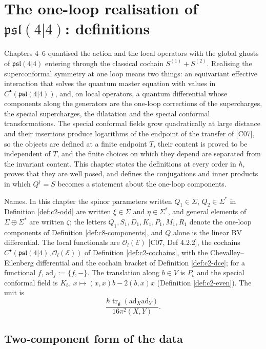 \chapter{The one-loop realisation of $\mathfrak{psl}(4|4)$: definitions}

Chapters 4--6 quantised the action and the local operators with the global ghosts of $\mathfrak{psl}(4|4)$ entering through the classical cochain $S^{(1)}+S^{(2)}$. Realising the superconformal symmetry at one loop means two things: an equivariant effective interaction that solves the quantum master equation with values in $C^\bullet(\mathfrak{psl}(4|4))$, and, on local operators, a quantum differential whose components along the generators are the one-loop corrections of the supercharges, the special supercharges, the dilatation and the special conformal transformations. The special conformal fields grow quadratically at large distance and their insertions produce logarithms of the endpoint of the transfer of [C07], so the objects are defined at a finite endpoint $T$, their content is proved to be independent of $T$, and the finite choices on which they depend are separated from the invariant content. This chapter states the definitions at every order in $\hbar$, proves that they are well posed, and defines the conjugations and inner products in which $Q^\dagger=S$ becomes a statement about the one-loop components.

Names. In this chapter the spinor parameters written $Q_1\in\Sigma$, $Q_2\in\Sigma^*$ in Definition \ref{def:c2-odd} are written $\xi\in\Sigma$ and $\eta\in\Sigma^*$, and general elements of $\Sigma\oplus\Sigma^*$ are written $\zeta$; the letters $Q_1,S_1,D_1,K_1,P_1,M_1,R_1$ denote the one-loop components of Definition \ref{def:c8-components}, and $Q$ alone is the linear BV differential. The local functionals are $\mathscr O_l(\mathscr E)$ [C07, Def 4.2.2], the cochains $C^\bullet(\mathfrak{psl}(4|4),\mathscr O_l(\mathscr E))$ of Definition \ref{def:c2-cochains}, with the Chevalley--Eilenberg differential and the cochain bracket of Definition \ref{def:c2-dce}; for a functional $f$, $\mathrm{ad}_f:=\{f,-\}$. The translation along $b\in V$ is $P_b$ and the special conformal field is $K_b$, $x\mapsto(x,x)b-2(b,x)x$ (Definition \ref{def:c2-even}). The unit is
\[
\frac{\hbar\operatorname{tr}_{\mathfrak g}(\mathrm{ad}_X\mathrm{ad}_Y)}{16\pi^2(X,Y)} .
\]

\section{Two-component form of the data}

